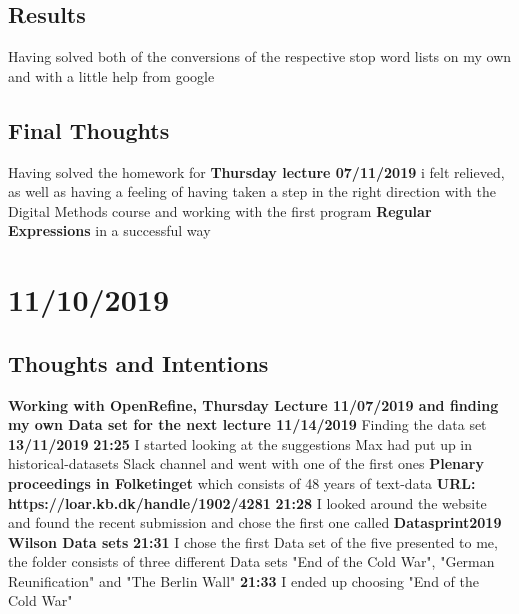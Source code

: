 \documentclass{article}
\begin{document}
\subsection{Results}
Having solved both of the conversions of the respective stop word lists on my own and with a little help from google
\subsection{Final Thoughts}
Having solved the homework for \textbf{Thursday lecture 07/11/2019} i felt relieved, as well as having a feeling of having taken a step in the right direction with the Digital Methods course and working with the first program \textbf{Regular Expressions} in a successful way
\newpage
\section{11/10/2019}
\newline

\subsection{Thoughts and Intentions}
\textbf{Working with OpenRefine, Thursday Lecture 11/07/2019 and finding my own Data set for the next lecture 11/14/2019}
\newline
Finding the data set \textbf{13/11/2019}
\newline
\newline
\textbf{21:25} I started looking at the suggestions Max had put up in historical-datasets Slack channel and went with one of the first ones \textbf{Plenary proceedings in Folketinget} which consists of 48 years of text-data \newline \textbf{URL: https://loar.kb.dk/handle/1902/4281}
\newline
\newline
\textbf{21:28} I looked around the website and found the recent submission and chose the first one called \textbf{Datasprint2019 Wilson Data sets}
\newline
\newline
\textbf{21:31} I chose the first Data set of the five presented to me, the folder consists of three different Data sets "End of the Cold War", "German Reunification" and "The Berlin Wall" 
\newline
\newline
\textbf{21:33} I ended up choosing "End of the Cold War" 
\end{document}

